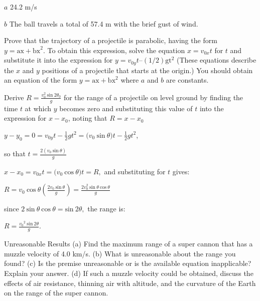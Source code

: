 \documentclass[
]{book}
\begin{document}
\leavevmode{}%
\(a\) 24.2 m/s

\(b\) The ball travels a total of 57.4 m with the brief gust of wind.

\hypertarget{fs-id2046931}{}
\leavevmode{}%
Prove that the trajectory of a projectile is parabolic, having the form
\({y = {\text{ax} + \text{bx}^{2}}}{}\). To obtain this expression, solve
the equation \({x = v_{0x}t}{}\) for \(t{}\) and substitute it into the
expression for \({{y = v_{0y}}t–({1/2})\text{gt}^{2}}{}\) (These equations
describe the \(x{}\) and \(y{}\) positions of a projectile that starts at
the origin.) You should obtain an equation of the form
\({y = {\text{ax} + \text{bx}^{2}}}{}\) where \(a{}\) and \(b{}\) are
constants.

\hypertarget{fs-id2133758}{}
\leavevmode{}%
Derive \({R = \frac{v_{0}^{2}\ \text{sin}\ 2\theta_{0}}{g}}{}\) for the
range of a projectile on level ground by finding the time \(t{}\) at which
\(y{}\) becomes zero and substituting this value of \(t{}\) into the
expression for \({x - x_{0}}{}\), noting that \({R = {x - x_{0}}}{}\)

\leavevmode{}%
\({{{{y - y_{0}} = 0} = v_{0y}}{t - \frac{1}{2}}{{gt}^{2} = (}v_{0}\ \text{sin}\ \theta){t - \frac{1}{2}}{gt}^{2}}{}\),

so that \({t = \frac{2(v_{0}\ \text{sin}\ \theta)}{g}}{}\)

\({{{x - x_{0}} = v_{0x}}{t = (}v_{0}\ \text{cos}\ \theta){t = R},}{}\)
and substituting for \(t{}\) gives:

\({{R = v_{0}}\ \text{cos}\ \theta{\left( \frac{{2v}_{0}\ \text{sin}\ \theta}{g} \right) = \frac{{2v}_{0}^{2}\ \text{sin}\ \theta\ \text{cos}\ \theta}{g}}}{}\)

since
\({2\ \text{sin}\ \theta\ \text{cos}\ {\theta = \text{sin}\ }2\theta,}{}\)
the range is:

\({R = \frac{{v_{0}}^{2}\ \text{sin}\ 2\theta}{g}}{}\).

\hypertarget{fs-id1794949}{}
\hypertarget{fs-id1626931}{}
{Unreasonable Results} (a) Find the maximum range of
a super cannon that has a muzzle velocity of 4.0 km/s. (b) What is
unreasonable about the range you found? (c) Is the premise unreasonable
or is the available equation inapplicable? Explain your answer. (d) If
such a muzzle velocity could be obtained, discuss the effects of air
resistance, thinning air with altitude, and the curvature of the Earth
on the range of the super cannon.
\end{document}
